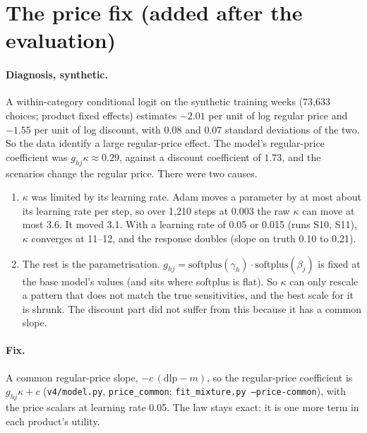 \documentclass[11pt]{article}
\begin{document}
\section{The price fix (added after the evaluation)}

\paragraph{Diagnosis, synthetic.} A within-category conditional logit on the synthetic training
weeks (73,633 choices; product fixed effects) estimates $-2.01$ per unit of log regular price and
$-1.55$ per unit of log discount, with $0.08$ and $0.07$ standard deviations of the two. So the
data identify a large regular-price effect. The model's regular-price coefficient was
$g_{hj}\kappa\approx0.29$, against a discount coefficient of $1.73$, and the scenarios change the
regular price. There were two causes.
\begin{enumerate}
\item $\kappa$ was limited by its learning rate. Adam moves a parameter by at most about its learning
  rate per step, so over 1,210 steps at 0.003 the raw $\kappa$ can move at most 3.6. It moved 3.1.
  With a learning rate of 0.05 or 0.015 (runs S10, S11), $\kappa$ converges at 11--12, and the response
  doubles (slope on truth 0.10 to 0.21).
\item The rest is the parametrisation. $g_{hj}=\mathrm{softplus}(\gamma_h)\cdot\mathrm{softplus}(\beta_j)$
  is fixed at the base model's values (and sits where softplus is flat). So $\kappa$ can only rescale
  a pattern that does not match the true sensitivities, and the best scale for it is shrunk. The
  discount part did not suffer from this because it has a common slope.
\end{enumerate}

\paragraph{Fix.} A common regular-price slope, $-c\,(\mathrm{dlp}-m)$, so the regular-price
coefficient is $g_{hj}\kappa+c$ (\texttt{v4/model.py}, \texttt{price\_common};
\texttt{fit\_mixture.py --price-common}), with the price scalars at learning rate 0.05. The law stays
exact: it is one more term in each product's utility.
\end{document}
